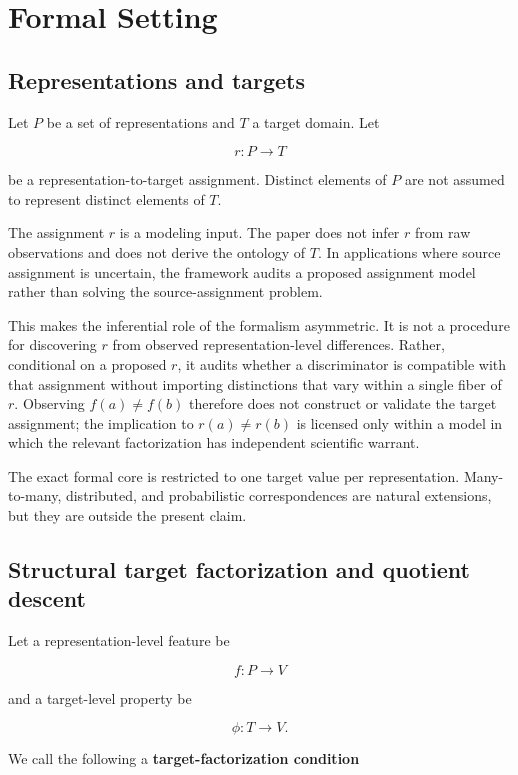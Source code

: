 \documentclass[11pt]{article}
\begin{document}
\section{Formal Setting}

\subsection{Representations and targets}

Let \(P\) be a set of representations and \(T\) a target domain. Let

\[
r:P\to T
\]

be a representation-to-target assignment. Distinct elements of \(P\) are not assumed to represent distinct elements of \(T\).

The assignment \(r\) is a modeling input. The paper does not infer \(r\) from raw observations and does not derive the ontology of \(T\). In applications where source assignment is uncertain, the framework audits a proposed assignment model rather than solving the source-assignment problem.

This makes the inferential role of the formalism asymmetric. It is not a procedure for discovering \(r\) from observed representation-level differences. Rather, conditional on a proposed \(r\), it audits whether a discriminator is compatible with that assignment without importing distinctions that vary within a single fiber of \(r\). Observing \(f(a)\neq f(b)\) therefore does not construct or validate the target assignment; the implication to \(r(a)\neq r(b)\) is licensed only within a model in which the relevant factorization has independent scientific warrant.

The exact formal core is restricted to one target value per representation. Many-to-many, distributed, and probabilistic correspondences are natural extensions, but they are outside the present claim.

\subsection{Structural target factorization and quotient descent}

Let a representation-level feature be

\[
f:P\to V
\]

and a target-level property be

\[
\phi:T\to V.
\]

We call the following a \textbf{target-factorization condition}
\end{document}
